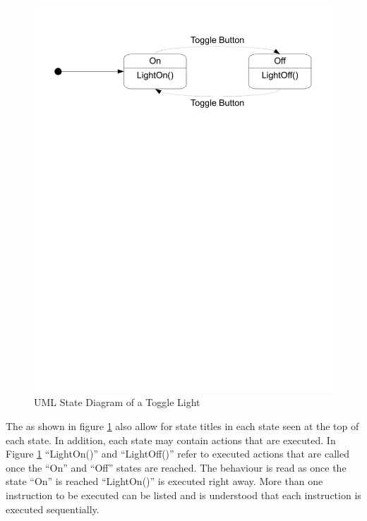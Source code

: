 \begin{figure}[htp]
    \centering
    \includegraphics[trim= 15mm 200mm 15mm 10mm, clip, width=\imgmedium]{./images/state_uml_light.pdf} 
    \caption{UML State Diagram of a Toggle Light}
    \label{fig:state_uml_light}
\end{figure}

The \cite{UML2} as shown in figure \ref{fig:state_uml_light} also allow for state titles in each state seen at the top of each state. In addition, each state may contain actions that are executed. In Figure \ref{fig:state_uml_light} ``LightOn()'' and ``LightOff()'' refer to executed actions that are called once the ``On'' and ``Off'' states are reached. The behaviour is read as once the state ``On'' is reached ``LightOn()'' is executed right away. More than one instruction to be executed can be listed and is understood that each instruction is executed sequentially\cite{UML2}.

